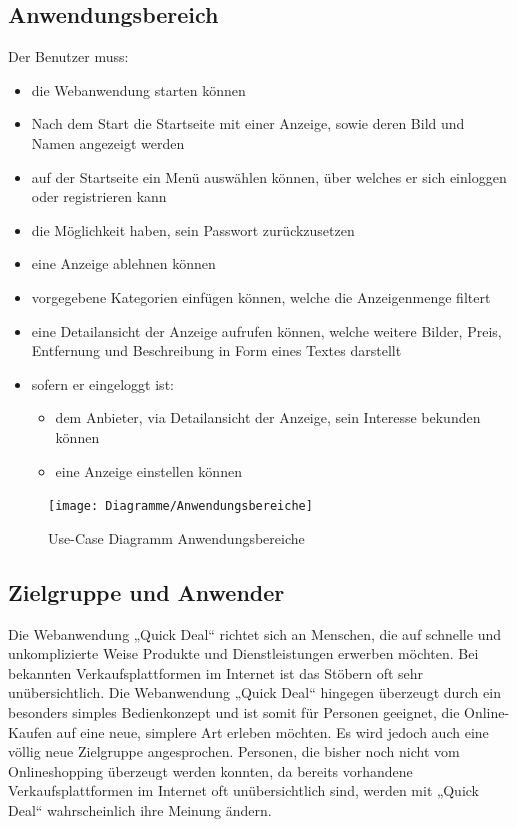 \documentclass[a4paper,12pt,oneside]{scrartcl}
\begin{document}
\subsection{Anwendungsbereich}
Der Benutzer muss:
\begin{itemize}
	\item die Webanwendung starten können
	\item Nach dem Start die Startseite mit einer Anzeige, sowie deren Bild und Namen angezeigt werden 
	\item auf der Startseite ein Menü auswählen können, über welches er sich einloggen oder registrieren kann 
	\item die Möglichkeit haben, sein Passwort zurückzusetzen 
	\item eine Anzeige ablehnen können 
	\item vorgegebene Kategorien einfügen können, welche die Anzeigenmenge filtert 
	\item eine Detailansicht der Anzeige aufrufen können, welche weitere Bilder, Preis, Entfernung und Beschreibung in Form eines Textes darstellt 

	\item sofern er eingeloggt ist: 
	\begin{itemize}
		\item dem Anbieter, via Detailansicht der Anzeige, sein Interesse bekunden können
		\item eine Anzeige einstellen können	
	\end{itemize}
\end{itemize}

\begin{figure}[!htbp]
\centering
\noindent\texttt{[image: Diagramme/Anwendungsbereiche]}
\caption{Use-Case Diagramm Anwendungsbereiche}
\end{figure}
\FloatBarrier


\subsection{Zielgruppe und Anwender}
Die Webanwendung „Quick Deal“ richtet sich an Menschen, die auf schnelle und unkomplizierte Weise Produkte und Dienstleistungen erwerben möchten.
Bei bekannten Verkaufsplattformen im Internet ist das Stöbern oft sehr unübersichtlich.
Die Webanwendung „Quick Deal“ hingegen überzeugt durch ein besonders simples Bedienkonzept und ist somit für Personen geeignet, die Online-Kaufen auf eine neue, simplere Art erleben möchten.
Es wird jedoch auch eine völlig neue Zielgruppe angesprochen.
Personen, die bisher noch nicht vom Onlineshopping überzeugt werden konnten, da bereits vorhandene Verkaufsplattformen im Internet oft unübersichtlich sind, werden mit „Quick Deal“ wahrscheinlich ihre Meinung ändern.
\end{document}
